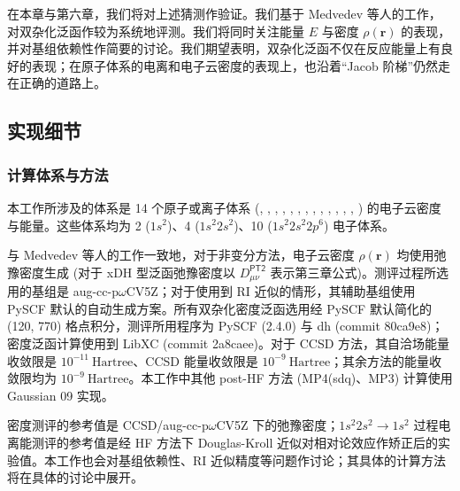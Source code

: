 在本章与第六章，我们将对上述猜测作验证。我们基于 Medvedev 等人的工作\cite{Medvedev-Lyssenko.S.2017}，对双杂化泛函作较为系统地评测。我们将同时关注能量 $E$ 与密度 $\rho(\bm{r})$ 的表现，并对基组依赖性作简要的讨论。我们期望表明，双杂化泛函不仅在反应能量上有良好的表现\cite{Su-Xu.WCMS.2016, Goerigk-Grimme.PCCP.2017, Zhang-Xu.JPCL.2021, Santra-Martin.JPCL.2021}；在原子体系的电离和电子云密度的表现上，也沿着“Jacob 阶梯”仍然走在正确的道路上。

\subsection{实现细节}

\subsubsection{计算体系与方法}

本工作所涉及的体系是 14 个原子或离子体系 (, , , , , , , , , , , , , ) 的电子云密度与能量。这些体系均为 2 ($1s^2$)、4 ($1s^2 2s^2$)、10 ($1s^2 2s^2 2p^6$) 电子体系。

与 Medvedev 等人的工作\cite{Medvedev-Lyssenko.S.2017}一致地，对于非变分方法，电子云密度 $\rho (\bm{r})$ 均使用弛豫密度生成 (对于 xDH 型泛函弛豫密度以 $D_{\mu \nu}^\textsf{PT2}$ 表示\alert{第三章公式})。测评过程所选用的基组是 aug-cc-p$\omega$CV5Z\cite{Dunning-Dunning.JCP.1989, Kendall-Harrison.JCP.1992, Peterson-Dunning.JCP.2002}；对于使用到 RI 近似的情形，其辅助基组使用 PySCF 默认的自动生成方案\cite{Stoychev-Neese.JCTC.2017}。所有双杂化密度泛函选用经 PySCF 默认简化的 (120, 770) 格点积分，测评所用程序为 PySCF (2.4.0)\cite{Sun-Chan.WCMS.2018, Sun-Chan.JCP.2020} 与 dh (commit 80ca9e8)；密度泛函计算使用到 LibXC (commit 2a8caee)\cite{Lehtola-Marques.S.2018}。对于 CCSD 方法，其自洽场能量收敛限是 $10^{-11} \ \text{Hartree}$、CCSD 能量收敛限是 $10^{-9} \ \text{Hartree}$；其余方法的能量收敛限均为 $10^{-9} \ \text{Hartree}$。本工作中其他 post-HF 方法 (MP4(sdq)、MP3) 计算使用 Gaussian 09 实现\cite{Gaussian09, Su-Xu.PNAS.2018}。

密度测评的参考值是 CCSD/aug-cc-p$\omega$CV5Z 下的弛豫密度；$1s^2 2s^2 \rightarrow 1s^2$ 过程电离能测评的参考值是经 HF 方法下 Douglas-Kroll 近似对相对论效应作矫正后的实验值\cite{Kepp-Kepp.S.2017, Douglas-Kroll.APY.1974, NIST.Atomic}。本工作也会对基组依赖性、RI 近似精度等问题作讨论；其具体的计算方法将在具体的讨论中展开。


